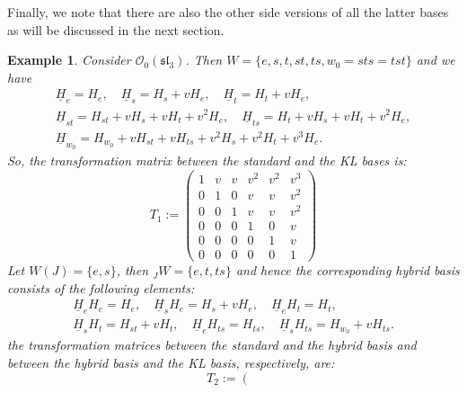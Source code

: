 \documentclass[a4paper]{amsart}
\newtheorem{example}[theorem]{Example}
\begin{document}

Finally, we note that there are also the other side versions of
all the latter bases as will be discussed in the next section.

\begin{example}\label{sl3-ebases}
{\rm
Consider $\mathcal{O}_{0}(\mathfrak{sl}_3)$. Then
$W=\{e,s,t,st,ts,w_0=sts=tst\}$ and we have 
\begin{gather*}
\underline{H}_e=H_e,\quad  
\underline{H}_s=H_s+vH_e,\quad  
\underline{H}_t=H_t+vH_e,\\  
\underline{H}_{st}=H_{st}+vH_s+vH_t+v^2H_e,\quad  
\underline{H}_{ts}=H_{t}+vH_s+vH_t+v^2H_e,\\  
\underline{H}_{w_0}=H_{w_0}+vH_{st}+vH_{ts}+v^2H_s+v^2H_t+v^3H_e.  
\end{gather*}
So, the transformation matrix between the standard and the KL bases is:
\begin{displaymath}
T_1:=\left(
\begin{array}{cccccc}
1&v&v&v^2&v^2&v^3\\ 
0&1&0&v&v&v^2\\ 
0&0&1&v&v&v^2\\ 
0&0&0&1&0&v\\ 
0&0&0&0&1&v\\ 
0&0&0&0&0&1
\end{array}
\right) 
\end{displaymath}
Let $W(J)=\{e,s\}$, then ${}_JW=\{e,t,ts\}$ and hence the corresponding
hybrid basis consists of the following elements:
\begin{gather*}
\underline{H}_eH_e=H_e,\quad
\underline{H}_sH_e=H_s+vH_e,\quad
\underline{H}_eH_t=H_t, \\
\underline{H}_sH_t=H_{st}+vH_t, \quad
\underline{H}_eH_{ts}=H_{ts}, \quad
\underline{H}_sH_{ts}=H_{w_0}+vH_{ts}. 
\end{gather*}
the transformation matrices between the standard and the
hybrid basis and between the hybrid basis and the 
KL basis, respectively, are:
\begin{displaymath}
T_2:=\left(
\begin{array}{cccccc}

\end{array}
\end{displaymath}}
\end{example}
\end{document}
